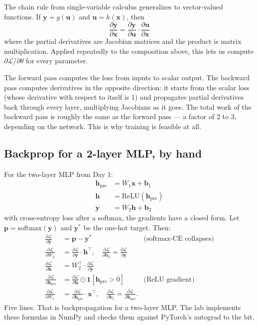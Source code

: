 The chain rule from single-variable calculus generalizes to vector-valued functions. If $\bm{y} = g(\bm{u})$ and $\bm{u} = h(\bm{x})$, then
\[
\frac{\partial \bm{y}}{\partial \bm{x}} = \frac{\partial \bm{y}}{\partial \bm{u}} \cdot \frac{\partial \bm{u}}{\partial \bm{x}}
\]
where the partial derivatives are Jacobian matrices and the product is matrix multiplication. Applied repeatedly to the composition above, this lets us compute $\partial \mathcal{L} / \partial \theta$ for every parameter.

\begin{intuition}
The forward pass computes the loss from inputs to scalar output. The backward pass computes derivatives in the opposite direction: it starts from the scalar loss (whose derivative with respect to itself is 1) and propagates partial derivatives back through every layer, multiplying Jacobians as it goes. The total work of the backward pass is roughly the same as the forward pass --- a factor of 2 to 3, depending on the network. This is why training is feasible at all.
\end{intuition}

\subsection{Backprop for a 2-layer MLP, by hand}

For the two-layer MLP from Day 1:
\begin{align*}
\bm{h}_{\text{pre}} &= W_1 \bm{x} + \bm{b}_1 \\
\bm{h} &= \mathrm{ReLU}(\bm{h}_{\text{pre}}) \\
\bm{y} &= W_2 \bm{h} + \bm{b}_2
\end{align*}
with cross-entropy loss after a softmax, the gradients have a closed form. Let $\bm{p} = \mathrm{softmax}(\bm{y})$ and $\bm{y}^*$ be the one-hot target. Then:
\begin{align*}
\frac{\partial \mathcal{L}}{\partial \bm{y}} &= \bm{p} - \bm{y}^* &\text{(softmax-CE collapses)} \\
\frac{\partial \mathcal{L}}{\partial W_2} &= \frac{\partial \mathcal{L}}{\partial \bm{y}} \cdot \bm{h}^\top, \quad \frac{\partial \mathcal{L}}{\partial \bm{b}_2} = \frac{\partial \mathcal{L}}{\partial \bm{y}} \\
\frac{\partial \mathcal{L}}{\partial \bm{h}} &= W_2^\top \cdot \frac{\partial \mathcal{L}}{\partial \bm{y}} \\
\frac{\partial \mathcal{L}}{\partial \bm{h}_{\text{pre}}} &= \frac{\partial \mathcal{L}}{\partial \bm{h}} \odot \mathbf{1}[\bm{h}_{\text{pre}} > 0] &\text{(ReLU gradient)} \\
\frac{\partial \mathcal{L}}{\partial W_1} &= \frac{\partial \mathcal{L}}{\partial \bm{h}_{\text{pre}}} \cdot \bm{x}^\top, \quad \frac{\partial \mathcal{L}}{\partial \bm{b}_1} = \frac{\partial \mathcal{L}}{\partial \bm{h}_{\text{pre}}}.
\end{align*}
Five lines. That is backpropagation for a two-layer MLP. The lab implements these formulas in NumPy and checks them against PyTorch's autograd to the bit.

